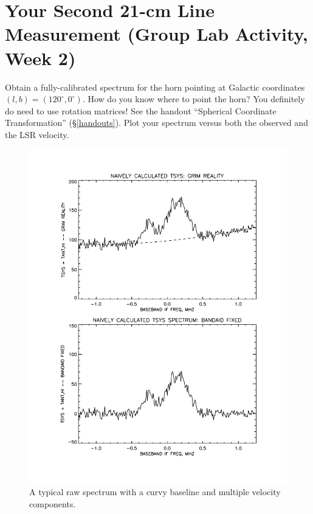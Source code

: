 \documentclass[11pt,preprint]{aastex}
\begin{document}
\section{Your Second 21-cm Line Measurement (Group Lab Activity, Week 2)}
\label{meas2}

\noindent
Obtain a fully-calibrated spectrum for the horn pointing at Galactic
coordinates $(l,b)=(120^\circ, 0^\circ)$. How do you know where to point
the horn? You definitely do need to use rotation matrices!  See the
handout ``Spherical Coordinate Transformation''
(\S \ref{handouts}). Plot your spectrum versus both the observed and
the LSR velocity. 

\begin{figure}[h!]
\begin{center}
%       
\includegraphics[scale=0.5]{bmp_cal1.pdf}
\end{center}
\vspace{-0.3in}
\caption{\footnotesize A typical raw spectrum with a curvy baseline and
  multiple velocity components. \label{rawspect}}
\end{figure}
\end{document}
